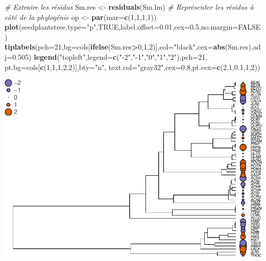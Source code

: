 \documentclass[
]{book}
\newenvironment{Shaded}{\begin{snugshade}}{\end{snugshade}}
\newcommand{\AttributeTok}[1]{\textcolor[rgb]{0.13,0.29,0.53}{#1}}
\newcommand{\CommentTok}[1]{\textcolor[rgb]{0.56,0.35,0.01}{\textit{#1}}}
\newcommand{\ConstantTok}[1]{\textcolor[rgb]{0.56,0.35,0.01}{#1}}
\newcommand{\DecValTok}[1]{\textcolor[rgb]{0.00,0.00,0.81}{#1}}
\newcommand{\FloatTok}[1]{\textcolor[rgb]{0.00,0.00,0.81}{#1}}
\newcommand{\FunctionTok}[1]{\textcolor[rgb]{0.13,0.29,0.53}{\textbf{#1}}}
\newcommand{\NormalTok}[1]{#1}
\newcommand{\OtherTok}[1]{\textcolor[rgb]{0.56,0.35,0.01}{#1}}
\newcommand{\SpecialCharTok}[1]{\textcolor[rgb]{0.81,0.36,0.00}{\textbf{#1}}}
\newcommand{\StringTok}[1]{\textcolor[rgb]{0.31,0.60,0.02}{#1}}
\begin{document}
\begin{Shaded}
\begin{Highlighting}[]
\CommentTok{\# Extraire les résidus}
\NormalTok{Sm.res }\OtherTok{\textless{}{-}} \FunctionTok{residuals}\NormalTok{(Sm.lm)}
\CommentTok{\# Représenter les résidus à côté de la phylogénie}
\NormalTok{op }\OtherTok{\textless{}{-}} \FunctionTok{par}\NormalTok{(}\AttributeTok{mar=}\FunctionTok{c}\NormalTok{(}\DecValTok{1}\NormalTok{,}\DecValTok{1}\NormalTok{,}\DecValTok{1}\NormalTok{,}\DecValTok{1}\NormalTok{))}
\FunctionTok{plot}\NormalTok{(seedplantstree,}\AttributeTok{type=}\StringTok{"p"}\NormalTok{,}\ConstantTok{TRUE}\NormalTok{,}\AttributeTok{label.offset=}\FloatTok{0.01}\NormalTok{,}\AttributeTok{cex=}\FloatTok{0.5}\NormalTok{,}\AttributeTok{no.margin=}\ConstantTok{FALSE}\NormalTok{)}
\FunctionTok{tiplabels}\NormalTok{(}\AttributeTok{pch=}\DecValTok{21}\NormalTok{,}\AttributeTok{bg=}\NormalTok{cols[}\FunctionTok{ifelse}\NormalTok{(Sm.res}\SpecialCharTok{\textgreater{}}\DecValTok{0}\NormalTok{,}\DecValTok{1}\NormalTok{,}\DecValTok{2}\NormalTok{)],}\AttributeTok{col=}\StringTok{"black"}\NormalTok{,}\AttributeTok{cex=}\FunctionTok{abs}\NormalTok{(Sm.res),}\AttributeTok{adj=}\FloatTok{0.505}\NormalTok{)}
\FunctionTok{legend}\NormalTok{(}\StringTok{"topleft"}\NormalTok{,}\AttributeTok{legend=}\FunctionTok{c}\NormalTok{(}\StringTok{"{-}2"}\NormalTok{,}\StringTok{"{-}1"}\NormalTok{,}\StringTok{"0"}\NormalTok{,}\StringTok{"1"}\NormalTok{,}\StringTok{"2"}\NormalTok{),}\AttributeTok{pch=}\DecValTok{21}\NormalTok{,}
       \AttributeTok{pt.bg=}\NormalTok{cols[}\FunctionTok{c}\NormalTok{(}\DecValTok{1}\NormalTok{,}\DecValTok{1}\NormalTok{,}\DecValTok{1}\NormalTok{,}\DecValTok{2}\NormalTok{,}\DecValTok{2}\NormalTok{)],}\AttributeTok{bty=}\StringTok{"n"}\NormalTok{,}
       \AttributeTok{text.col=}\StringTok{"gray32"}\NormalTok{,}\AttributeTok{cex=}\FloatTok{0.8}\NormalTok{,}\AttributeTok{pt.cex=}\FunctionTok{c}\NormalTok{(}\DecValTok{2}\NormalTok{,}\DecValTok{1}\NormalTok{,}\FloatTok{0.1}\NormalTok{,}\DecValTok{1}\NormalTok{,}\DecValTok{2}\NormalTok{))}
\end{Highlighting}
\end{Shaded}

\includegraphics{pcm-workshop_files/figure-latex/Challenge 1 - solution-1.pdf}
\end{document}
